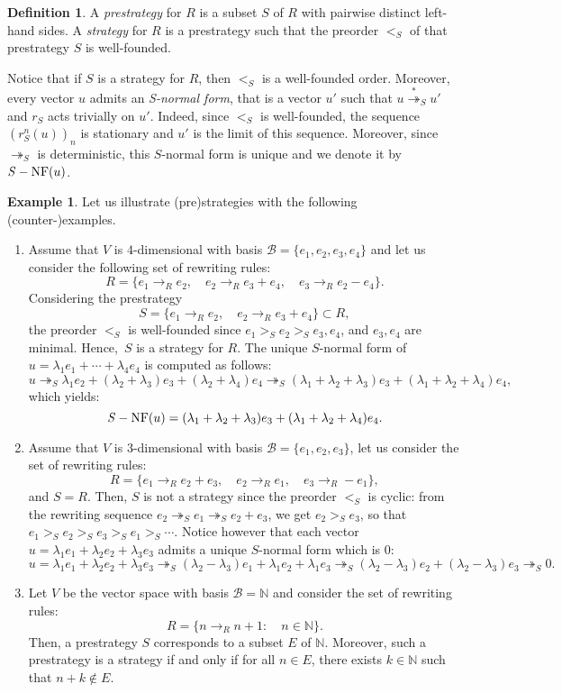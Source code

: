 \documentclass[11pt]{article}
\theoremstyle{definition}
\newtheorem{definition}[theorem]{Definition}
\newtheorem{example}[theorem]{Example}
\newcommand\basis{\mathscr{B}}
\newcommand\ordS{<_S}
\newcommand\N{\mathbb{N}}
\newcommand\rewR{\to_R}
\newcommand\parS{\twoheadrightarrow_S}
\newcommand\transS{\overset{*}{\twoheadrightarrow}_S}
\DeclareMathOperator{\SNF}{{\it S}-NF}
\begin{document}
\begin{definition}\label{def:strategies}
  A {\em prestrategy} for $R$ is a subset $S$ of $R$ with pairwise
  distinct left-hand sides. A {\em strategy} for $R$ is a prestrategy
  such that the preorder $\ordS$ of that prestrategy $S$ is well-founded. 
\end{definition}
\smallskip

Notice that if $S$ is a strategy for $R$, then $\ordS$ is a well-founded
order. Moreover, every vector $u$ admits an {\em S-normal form}, that is
a vector $u'$ such that $u\transS u'$ and $r_S$ acts trivially on $u'$.
Indeed, since $\ordS$ is well-founded, the sequence $(r_S^n(u))_n$ is
stationary and $u'$ is the limit of this sequence. Moreover, since
$\parS$ is deterministic, this $S$-normal form is unique and we denote it
by~$\SNF(u)$. 
\smallskip

\begin{example}\label{ex:strategies_step_1}
  Let us illustrate (pre)strategies with the following
  (counter-)examples.
  \begin{enumerate}
  \item\label{it:ex_strat_1} Assume that $V$ is $4$-dimensional with
    basis $\basis=\{e_1,e_2,e_3,e_4\}$ and let us consider the following
    set of rewriting rules:
    \[R=\{e_1\rewR e_2,\quad e_2\rewR e_3+e_4,\quad e_3\rewR e_2-e_4\}.\]
    Considering the prestrategy
    \[S=\{e_1\rewR e_2,\quad e_2\rewR e_3+e_4\}\subset R,\]
    the preorder $\ordS$ is well-founded since $e_1>_Se_2>_Se_3,e_4$, and
    $e_3,e_4$ are minimal. Hence,~$S$ is a strategy for $R$. The unique
    $S$-normal form of $u=\lambda_1e_1+\cdots+\lambda_4e_4$ is computed
    as follows:
    \[u\parS\lambda_1e_2+(\lambda_2+\lambda_3)e_3+
    (\lambda_2+\lambda_4)e_4\parS(\lambda_1+\lambda_2+\lambda_3)e_3+
    (\lambda_1+\lambda_2+\lambda_4)e_4,\]
    which yields:
    \[\SNF(u)=(\lambda_1+\lambda_2+\lambda_3)e_3+
    (\lambda_1+\lambda_2+\lambda_4)e_4.\]
  \item\label{it:c-ex_strat_1} Assume that $V$ is $3$-dimensional with
    basis $\basis=\{e_1,e_2,e_3\}$, let us consider the set of rewriting
    rules:
    \[R=\{e_1\rewR e_2+e_3,\quad e_2\rewR e_1,\quad e_3\rewR -e_1\},\]
    and $S=R$. Then, $S$ is not a strategy since the preorder $\ordS$ is
    cyclic: from the rewriting sequence $e_2\parS e_1\parS e_2+e_3$, we
    get $e_2>_Se_3$, so that $e_1>_S e_2>_S e_3>_S e_1>_S\cdots$. Notice
    however that each vector $u=\lambda_1e_1+\lambda_2e_2+\lambda_3e_3$
    admits a unique $S$-normal form which is $0$:
    \[u=\lambda_1e_1+\lambda_2e_2+\lambda_3e_3\parS(\lambda_2-\lambda_3)
    e_1+\lambda_1e_2+\lambda_1e_3\parS(\lambda_2-\lambda_3)e_2+(\lambda_2-
    \lambda_3)e_3\parS 0.
    \]
  \item\label{it:case_N} Let $V$ be the vector space with basis
    $\basis= \mathbb N$ and consider the set of rewriting rules:
    \[R=\{n\rewR n+1:\quad n\in\N\}.\]
    Then, a prestrategy $S$ corresponds to a subset $E$ of $\mathbb N$.
    Moreover, such a prestrategy is a strategy if and only if for all
    $n\in E$, there exists $k\in \mathbb N$ such that $n + k \notin E$. 
  \end{enumerate}
\end{example}
\smallskip
\end{document}
